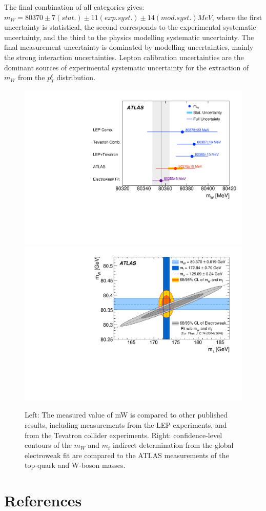 \documentclass{moriond}
\begin{document}
The final combination of all categories gives: $m_W = 80370 \pm 7
(stat.) \pm 11 (exp. syst.) \pm 14 (mod. syst.) MeV$, where the first
uncertainty is statistical, the second corresponds to the experimental
systematic uncertainty, and the third to the physics modelling
systematic uncertainty. The final measurement uncertainty is dominated
by modelling uncertainties, mainly the strong interaction
uncertainties. Lepton calibration uncertainties are the dominant
sources of experimental systematic uncertainty for the extraction of
$m_W$ from the $p_T^\ell$ distribution.
%
\begin{figure}[!htbp]
  \centerline{
    \includegraphics[width=0.45\linewidth,draft=false]{Fig4a.pdf}
    \includegraphics[width=0.45\linewidth,draft=false]{Fig4b.pdf}
  }
  \caption[]{ Left: The measured value of mW is compared to other
    published results, including measurements from the LEP
    experiments, and from the Tevatron collider experiments. Right:
    confidence-level contours of the $m_W$ and $m_t$ indirect
    determination from the global electroweak fit are compared to the
    ATLAS measurements of the top-quark and W-boson masses.
    \label{fig:wmass}}
\end{figure}
%



\section*{References}
\end{document}
